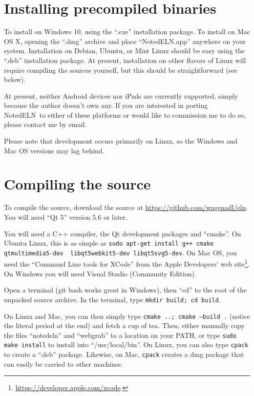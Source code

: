 \documentclass[11pt]{report}
\def\terminal#1{{\tt#1}}
\newcommand{\NotedELN}{NotedELN} %
\begin{document}
\section{Installing precompiled binaries}

To install on Windows 10, using the ``.exe'' installation
package. To install on Mac OS X, opening the ``.dmg'' archive and
place ``\NotedELN.app'' anywhere on your system.  Installation on
Debian, Ubuntu, or Mint Linux should be easy using the
``.deb'' installation package. At present, installation on other
flavors of Linux will require compiling the sources yourself, but this
should be straightforward (see below).

At present, neither Android devices nor iPads are currently supported,
simply because the author doesn't own any. If you are interested in
porting \NotedELN\ to either of these platforms or would like to commission
me to do so, please contact me by email.

Please note that development occurs primarily on Linux, so the Windows
and Mac OS versions may lag behind.

\section{Compiling the source}
To compile the source, download the source at \url{https://github.com/wagenadl/eln}. You will need
``Qt 5'' version 5.6 or later.

You will need a C++ compiler, the Qt development packages and
``cmake''. On Ubuntu Linux, this is as simple as \terminal{sudo
  apt-get install g++ cmake qtmultimedia5-dev
  \ libqt5webkit5-dev libqt5svg5-dev}.  On Mac OS, you need the
``Command Line tools for XCode'' from the Apple Developers' web
site\footnote{\url{https://developer.apple.com/xcode}.}. On Windows you will
need Visual Studio (Community Edition).

Open a terminal (git bash works great in Windows), then ``cd'' to the
root of the unpacked source archive. In the terminal, type
\terminal{mkdir build; cd build}.

On Linux and Mac, you can then simply type \terminal{cmake ..; cmake
  --build .} (notice the literal period at the end) and fetch a cup of tea. Then, either manually copy the
files ``notedeln'' and ``webgrab'' to a location on your PATH, or type
\terminal{sudo make install} to install into ``/usr/local/bin''. On
Linux, you can also type \terminal {cpack} to create a ``.deb''
package. Likewise, on Mac, \terminal{cpack} creates a dmg package that
can easily be carried to other machines.
\end{document}
